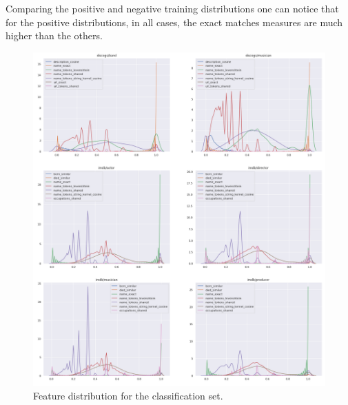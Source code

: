 \documentclass[epsfig,a4paper,11pt,titlepage,twoside,openany]{book}
\begin{document}
Comparing the positive and negative training distributions one can notice that for the positive distributions, in all cases, the exact matches measures are much higher than the others.


\begin{figure}[H]
  \centering \includegraphics[width=\textwidth]{classification_feature_distribution} 
  \caption{Feature distribution for the classification set.}
  \label{fig:distribution-of-classification-features-1}
\end{figure}
\end{document}
